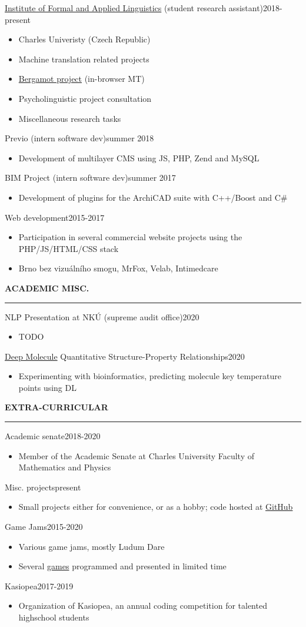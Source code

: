 \documentclass[11pt,a4paper]{article} %
\newcommand{\hSection}[1]{
    \medskip
    \MakeUppercase{\bf #1}
    \medskip
    \hrule
}
\newcommand{\hSubsectionItemize}[3]{
    {#1}\hfill {\footnotesize #2}\hspace{-1cm}\\
    \vspace{-0.5cm}
    \begin{itemize} \footnotesize #3 \end{itemize}
    \vspace{0.3\baselineskip}
}
\begin{document}
\hSubsectionItemize
{\href{https://ufal.mff.cuni.cz}{Institute of Formal and Applied Linguistics} (student research assistant)}
{2018-present}
{
    \item Charles Univeristy (Czech Republic)
    \item Machine translation related projects
    \item \href{https://browser.mt/}{Bergamot project} (in-browser MT)
    \item Psycholinguistic project consultation
    \item Miscellaneous research tasks
}

\hSubsectionItemize
{Previo (intern software dev)}
{summer 2018}
{
    \item Development of multilayer CMS using JS, PHP, Zend and MySQL
}

\hSubsectionItemize
{BIM Project (intern software dev)}
{summer 2017}
{
    \item Development of plugins for the ArchiCAD suite with C++/Boost and C\#
}

\hSubsectionItemize
{Web development}
{2015-2017}
{
\item Participation in several commercial website projects using the PHP/JS/HTML/CSS stack
\item Brno bez vizuálního smogu, MrFox, Velab, Intimedcare 
}


\hSection{Academic Misc.}

\hSubsectionItemize
{NLP Presentation at NKÚ (supreme audit office)}
{2020}
{
\item TODO
}

\hSubsectionItemize
{\href{https://github.com/zouharvi/deep-molecule-qspr}{Deep Molecule} Quantitative Structure-Property Relationships}
{2020}
{
\item Experimenting with bioinformatics, predicting molecule key temperature points using DL
}


\hSection{Extra-Curricular}
\hSubsectionItemize
{Academic senate}
{2018-2020}
{
\item Member of the Academic Senate at Charles University Faculty of Mathematics and Physics
}

\hSubsectionItemize
{Misc. projects}
{present}
{
\item Small projects either for convenience, or as a hobby; code hosted at \href{https://github.com/zouharvi}{GitHub}
}

\hSubsectionItemize
{Game Jams}
{2015-2020}
{
\item Various game jams, mostly Ludum Dare
\item Several \href{https://github.com/allemansratten}{games} programmed and presented in limited time
}

\hSubsectionItemize
{Kasiopea}
{2017-2019}
{
\item Organization of Kasiopea, an annual coding competition for talented highschool students
}
\end{document}

